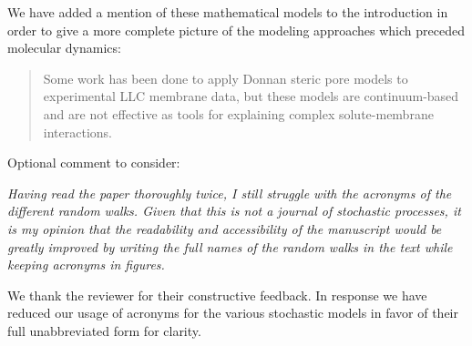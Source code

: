 \documentclass{article}
\begin{document}
\begin{enumerate}[label={Comment \theenumi :}, leftmargin=3.9\parindent]
		  We have added a mention of these mathematical models to the introduction in order to give
		  a more complete picture of the modeling approaches which preceded molecular dynamics:
		  \begin{quote}
		    Some work has been done to apply Donnan steric pore models to experimental LLC membrane 
		    data, but these models are continuum-based and are not effective as tools for explaining
		    complex solute-membrane interactions.~\cite{hatakeyama_water_2011}
		  \end{quote}
		  
  \end{enumerate}

\noindent Optional comment to consider:\\
\begin{addmargin}[5.8em]{0em}
	\textit{Having read the paper thoroughly twice, I still struggle with the acronyms of the different random
	walks. Given that this is not a journal of stochastic processes, it is my opinion that the readability
	and accessibility of the manuscript would be greatly improved by writing the full names of the
	random walks in the text while keeping acronyms in figures. \\}
	
	We thank the reviewer for their constructive feedback. In response we have reduced our usage of
	acronyms for the various stochastic models in favor of their full unabbreviated form for clarity.
	
\end{addmargin}
\end{document}
